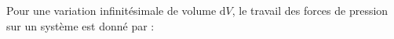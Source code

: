 ﻿\documentclass[a4paper]{article}
\begin{document}
\pagestyle{fancy}
\fancyhf{}
\setlength{\headheight}{15pt}

\begin{center}
	\large{}
\end{center}


Pour une variation infinitésimale de volume \(\mathrm{d}V\), le travail des forces de pression sur un système est donné par :\begin{center}\end{center}
\end{document}
